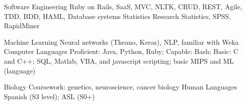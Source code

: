 

\begin{cvskills}

  \cvskill
    {Software Engineering} %
    {Ruby on Rails, SaaS, MVC, NLTK, CRUD, REST, Agile, TDD, BDD, HAML, Database systems } %
  \cvskill
    {Statistics} %
    {Research Statistics, SPSS, RapidMiner} %

	\cvskill
    {Machine Learning} %
    {Neural networks (Theano, Keras), NLP, familiar with Weka} %
  \cvskill
    {Computer Languages} %
    {Proficient: Java, Python, Ruby; Capable: Bash; Basic: C and C++; SQL, Matlab, VBA, and javascript scripting; basic MIPS and ML (language)} %
    
\cvskill
{Biology}
{Coursework: genetics, neuroscience, cancer biology}
  \cvskill
    {Human Languages} %
    {Spanish (S3 level); ASL (S0+)} %

\end{cvskills}
